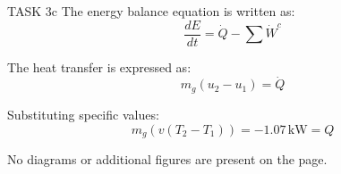TASK 3c  
The energy balance equation is written as:  
\[
\frac{dE}{dt} = \dot{Q} - \sum \dot{W}^c
\]  

The heat transfer is expressed as:  
\[
m_g (u_2 - u_1) = \dot{Q}
\]  

Substituting specific values:  
\[
m_g (v(T_2 - T_1)) = -1.07 \, \text{kW} = Q
\]  

No diagrams or additional figures are present on the page.